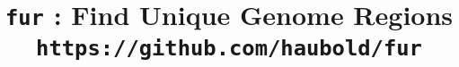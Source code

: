 

\pagestyle{noweb}

\title{\texttt{fur} : Find Unique Genome
Regions\\\small \texttt{https://github.com/haubold/fur}}
\author{}
\maketitle

\tableofcontents





